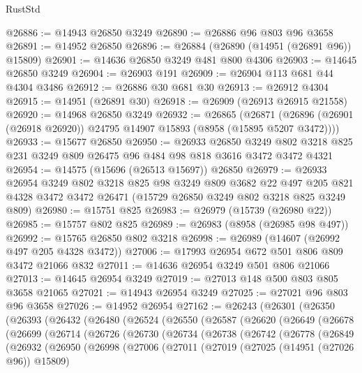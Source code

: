 \begin{lexlean}{RustStd}
\begin{coremodule}
@26886 := @14943 @26850 @3249
@26890 := @26886 @96 @803 @96 @3658
@26891 := @14952 @26850
@26896 := @26884 (@26890 (@14951 (@26891 @96)) @15809)
@26901 := @14636 @26850 @3249 @481 @800 @4306
@26903 := @14645 @26850 @3249
@26904 := @26903 @191
@26909 := @26904 @113 @681 @44 @4304 @3486
@26912 := @26886 @30 @681 @30
@26913 := @26912 @4304
@26915 := @14951 (@26891 @30)
@26918 := @26909 (@26913 @26915 @21558)
@26920 := @14968 @26850 @3249
@26932 := @26865
    (@26871 (@26896 (@26901 (@26918 @26920)) @24795 @14907 @15893 (@8958 (@15895 @5207 @3472))))
@26933 := @15677 @26850
@26950 := @26933
    @26850
    @3249
    @802
    @3218
    @825
    @231
    @3249
    @809
    @26475
    @96
    @484
    @98
    @818
    @3616
    @3472
    @3472
    @4321
@26954 := @14575 (@15696 (@26513 @15697)) @26850
@26979 := @26933
    @26954
    @3249
    @802
    @3218
    @825
    @98
    @3249
    @809
    @3682
    @22
    @497
    @205
    @821
    @4328
    @3472
    @3472
    @26471
    (@15729 @26850 @3249 @802 @3218 @825 @3249 @809)
@26980 := @15751 @825
@26983 := @26979 (@15739 (@26980 @22))
@26985 := @15757 @802 @825
@26989 := @26983 (@8958 (@26985 @98 @497))
@26992 := @15765 @26850 @802 @3218
@26998 := @26989 (@14607 (@26992 @497 @205 @4328 @3472))
@27006 := @17993 @26954 @672 @501 @806 @809 @3472 @21066 @832
@27011 := @14636 @26954 @3249 @501 @806 @21066
@27013 := @14645 @26954 @3249
@27019 := @27013 @148 @500 @803 @805 @3658 @21065
@27021 := @14943 @26954 @3249
@27025 := @27021 @96 @803 @96 @3658
@27026 := @14952 @26954
@27162 := @26243
    (@26301
      (@26350
        (@26393
          (@26432
            (@26480
              (@26524
                (@26550
                  (@26587
                    (@26620
                      (@26649
                        (@26678
                          (@26699
                            (@26714
                              (@26726
                                (@26730
                                  (@26734
                                    (@26738
                                      (@26742
                                        (@26778
                                          (@26849
                                            (@26932
                                              (@26950
                                                (@26998
                                                  (@27006
                                                    (@27011
                                                      (@27019
                                                        (@27025 (@14951 (@27026 @96)) @15809)

\end{coremodule}
\end{lexlean}
